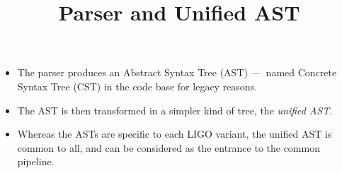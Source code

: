 \documentclass[wide]{slides}
\begin{document}
\begin{slide}
  \title{Parser and Unified AST}

  \begin{itemize}

    \item The parser produces an Abstract Syntax Tree (AST) ---~named
      Concrete Syntax Tree (CST) in the code base for legacy reasons.

    \item The AST is then transformed in a simpler kind of tree, the
      \emph{unified AST}.

    \item Whereas the ASTs are specific to each LIGO variant, the
      unified AST is common to all, and can be considered as the
      entrance to the common pipeline.

  \end{itemize}
\end{slide}
\end{document}
